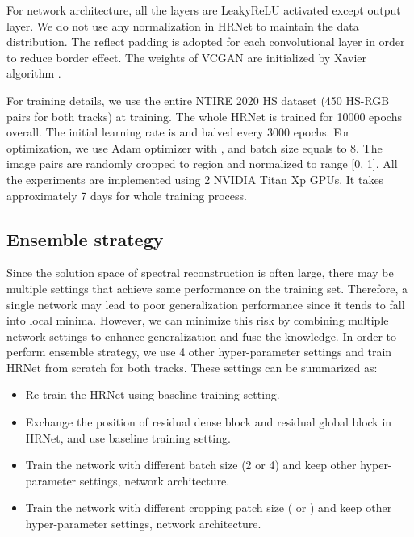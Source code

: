 \documentclass[10pt,twocolumn,letterpaper]{article}
\begin{document}
For network architecture, all the layers are LeakyReLU \cite{maas2013rectifier} activated except output layer. We do not use any normalization in HRNet to maintain the data distribution. The reflect padding is adopted for each convolutional layer in order to reduce border effect. The weights of VCGAN are initialized by Xavier algorithm \cite{glorot2010understanding}.

For training details, we use the entire NTIRE 2020 HS dataset (450 HS-RGB pairs for both tracks) at training. The whole HRNet is trained for 10000 epochs overall. The initial learning rate is  and halved every 3000 epochs. For optimization, we use Adam optimizer with  ,  and batch size equals to 8. The image pairs are randomly cropped to  region and normalized to range [0, 1]. All the experiments are implemented using 2 NVIDIA Titan Xp GPUs. It takes approximately 7 days for whole training process.

\subsection{Ensemble strategy}

Since the solution space of spectral reconstruction is often large, there may be multiple settings that achieve same performance on the training set. Therefore, a single network may lead to poor generalization performance since it tends to fall into local minima. However, we can minimize this risk by combining multiple network settings to enhance generalization and fuse the knowledge. In order to perform ensemble strategy, we use 4 other hyper-parameter settings and train HRNet from scratch for both tracks. These settings can be summarized as:

\begin{itemize}

\item Re-train the HRNet using baseline training setting.

\item Exchange the position of residual dense block and residual global block in HRNet, and use baseline training setting.

\item Train the network with different batch size (2 or 4) and keep other hyper-parameter settings, network architecture.

\item Train the network with different cropping patch size ( or ) and keep other hyper-parameter settings, network architecture.

\end{itemize}
\end{document}
